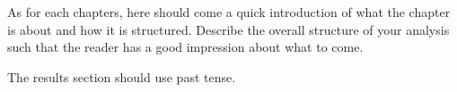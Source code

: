 As for each chapters, here should come a quick introduction of what the chapter is about and how it is structured. Describe the overall structure of your analysis such that the reader has a good impression about what to come. 

The results section should use past tense.